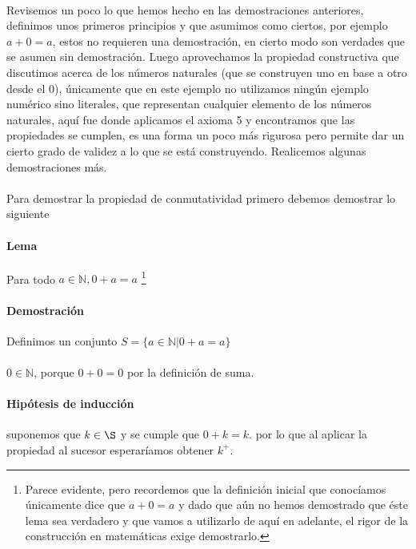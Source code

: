 \documentclass{article}
\begin{document}
\paragraph{} Revisemos un poco lo que hemos hecho en las demostraciones anteriores, definimos unos primeros principios y que asumimos como ciertos, por ejemplo $a + 0 = a$, estos no requieren una demostración, en cierto modo son verdades que se asumen sin demostración. Luego aprovechamos la propiedad constructiva que discutimos acerca de los números naturales (que se construyen uno en base a otro desde el 0), únicamente que en este ejemplo no utilizamos ningún ejemplo numérico sino literales, que representan cualquier elemento de los números naturales, aquí fue donde aplicamos el axioma 5 y encontramos que las propiedades se cumplen, es una forma un poco más rigurosa pero permite dar un cierto grado de validez a lo que se está construyendo. Realicemos algunas demostraciones más.

\paragraph{} Para demostrar la propiedad de conmutatividad primero debemos demostrar lo siguiente

\paragraph{Lema} Para todo $a \in \mathbb{N}, 0 + a = a$ \footnote{Parece evidente, pero recordemos que la definición inicial que conocíamos únicamente dice que $a + 0 = a$ y dado que aún no hemos demostrado que éste lema sea verdadero y que vamos a utilizarlo de aquí en adelante, el rigor de la construcción en matemáticas exige demostrarlo.}

\paragraph{Demostración} Definimos un conjunto $S = \{a \in \mathbb{N}| 0 + a = a \}$

\paragraph{} $0 \in \mathbb{N}$, porque $0 + 0 = 0$ por la definición de suma.

\paragraph{Hipótesis de inducción} suponemos que $k \in \S$ y se cumple que $0 + k = k$. por lo que al aplicar la propiedad al sucesor esperaríamos obtener $k^+$.
\end{document}
